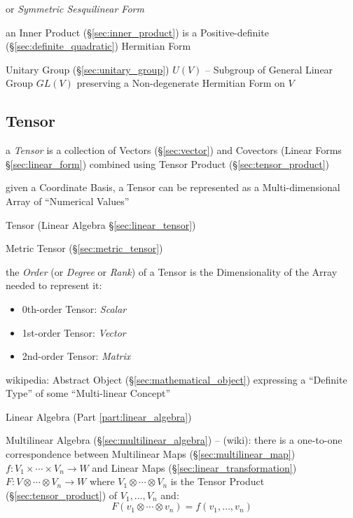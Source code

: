 or \emph{Symmetric Sesquilinear Form}

an Inner Product (\S\ref{sec:inner_product}) is a Positive-definite
(\S\ref{sec:definite_quadratic}) Hermitian Form

Unitary Group (\S\ref{sec:unitary_group}) $U(V)$ -- Subgroup of General Linear
Group $GL(V)$ preserving a Non-degenerate Hermitian Form on $V$



\subsection{Tensor}\label{sec:tensor}


a \emph{Tensor} is a collection of Vectors (\S\ref{sec:vector}) and Covectors
(Linear Forms \S\ref{sec:linear_form}) combined using Tensor Product
(\S\ref{sec:tensor_product})

given a Coordinate Basis, a Tensor can be represented as a Multi-dimensional
Array of ``Numerical Values'' %

\fist Tensor (Linear Algebra \S\ref{sec:linear_tensor})

\fist Metric Tensor (\S\ref{sec:metric_tensor})

the \emph{Order} (or \emph{Degree} or \emph{Rank}) of a Tensor is the
Dimensionality of the Array needed to represent it:

\begin{itemize}
  \item 0th-order Tensor: \emph{Scalar}
  \item 1st-order Tensor: \emph{Vector}
  \item 2nd-order Tensor: \emph{Matrix}
\end{itemize}

wikipedia: Abstract Object (\S\ref{sec:mathematical_object}) expressing a
``Definite Type'' of some ``Multi-linear Concept''

Linear Algebra (Part \ref{part:linear_algebra})

Multilinear Algebra (\S\ref{sec:multilinear_algebra}) --
(wiki): there is a one-to-one correspondence between Multilinear Maps
(\S\ref{sec:multilinear_map})
$f : V_1 \times \cdots \times V_n \rightarrow W$
and Linear Maps (\S\ref{sec:linear_transformation})
$F : V \otimes \cdots \otimes V_n \rightarrow W$
where $V_1 \otimes \cdots \otimes V_n$ is the Tensor Product
(\S\ref{sec:tensor_product}) of $V_1, \ldots, V_n$ and:
\[
  F(v_1 \otimes \cdots \otimes v_n) = f(v_1, \ldots, v_n)
\]

